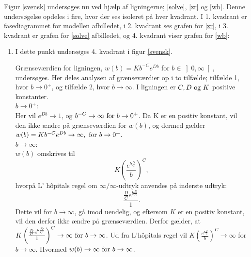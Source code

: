 Figur \ref{svensk} undersøges nu ved hjælp af ligningerne; \eqref{solve}, \eqref{zr} og \eqref{wb}. Denne undersøgelse opdeles i fire, hvor der ses isoleret på hver kvadrant. I 1. kvadrant er fasediagrammet for modellen afbilledet, i 2. kvadrant ses grafen for \eqref{zr}, i 3. kvadrant er grafen for \eqref{solve} afbilledet, og 4. kvadrant viser grafen for \eqref{wb}:
\begin{enumerate}
    \item I dette punkt undersøges 4. kvadrant i figur \ref{svensk}. 
    
    Grænseværdien for ligningen, $w(b) = K b^{-C} e^{Db}$ for $b \in  \left] 0, \infty \right[$, undersøges. Her deles analysen af grænseværdier op i to tilfælde; tilfælde 1, hvor $b \to 0^+$, og tilfælde 2, hvor $b \to \infty$. I ligningen er $C, D \ \textnormal{og} \ K$ positive konstanter.\\
    \hfill \break
    $b \to 0^{+}$:  \\
    Her vil $e^{Db} \to 1$, og $b^{-C}\to \infty \ \textnormal{for} \ b \to 0^+$. Da K er en positiv konstant, vil den ikke ændre på grænseværdien for $w(b)$, og dermed gælder $w(b)=K b^{-C} e^{Db} \to \infty, \ \textnormal{for} \ b \to 0^+.$ \\
    
    $b \to \infty$:\\
    $w(b)$ omskrives til 
    \begin{equation}\label{flh1}
        K \left( \frac{e^{b \frac{D}{C}}}{b} \right)^C,
    \end{equation}
    hvorpå L' hôpitals regel om $\infty/\infty$-udtryk \citep[sætning 7.23 s. 125]{Analyse bog} anvendes på inderste udtryk:
    \begin{equation} \label{lh1}
        \frac{\frac{D}{C} e^{b\frac{D}{C}}}{1}.
    \end{equation}
    Dette vil for $b \to \infty$, gå imod uendelig, og eftersom $K$ er en positiv konstant, vil den derfor ikke ændre på grænseværdien. Derfor gælder, at $K \left(\frac{\frac{D}{C} e^{b\frac{D}{C}}}{1}\right)^C\to \infty \ \textnormal{for} \ b \to \infty$.
    Ud fra L'hôpitals regel \citep[sætning 7.23 s. 125]{Analyse bog} vil $K \left( \frac{e^{b \frac{D}{C}}}{b} \right)^C \to \infty$ for $b \to \infty$. Hvormed $w(b) \to \infty \ \textnormal{for} \ b \to \infty$.\\
   

\end{enumerate}
